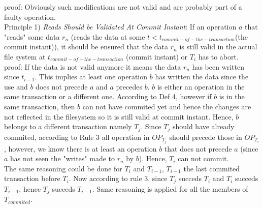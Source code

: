 \documentclass[a4paper, 11pt]{article}
\begin{document}




proof: Obviously such modifications are not valid and are probably part of a faulty operation.\\


Principle 1) \emph{Reads Should be Validated At Commit Instant}: If an operation $a$ that "reads" some data $r_n$ (reads the data at some $t < t_{commit-of-the-transaction}$(the commit instant)), it should be ensured that the data $r_n$ is still valid in the actual file system at $t_{commit-of-the-transaction}$ (commit instant) or $T_i$ has to abort.\\

proof: If the data is not valid anymore it means the data $r_n$ has been written since $t_{i-1}$. This implies at least one operation $b$ has written the data since the use and $b$ does not precede $a$ and $a$ precedes $b$. $b$ is either an operation in the same transaction or a different one. According to Def 4, however if $b$ is in the same transaction, then $b$ can not have commited yet and hence the changes are not reflected in the filesystem so it is still valid at commit instant. Hence, $b$ belongs to a different transaction namely $T_j$. Since $T_j$ should have already commited, according to Rule 3 all operation in $OP_{T_j}$ should precede those in $OP_{T_i}$, however, we know there is at least an operation $b$ that does not precede $a$ (since $a$ has not seen the "writes" made to $r_n$ by $b$). Hence, $T_i$ can not commit.\\

The same reasoning could be done for $T_i$ and $T_{i-1}$, $T_{i-1}$ the last commited transaction before $T_{i}$. Now according to rule 3, since $T_j$ succeds $T_i$ and $T_i$ succeds $T_{i-1}$, hence $T_j$ succeds $T_{i-1}$. Same reasoning is applied for all the members of $T_{commited}$. \\ 
\end{document}
